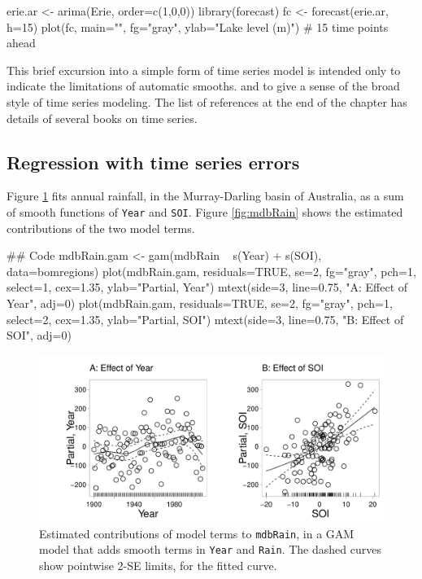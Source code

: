 \documentclass{tufte-book}\usepackage[]{graphicx}\usepackage[]{color}
\newcommand{\txtt}[1]{\texttt{#1}}
\begin{document}
\begin{marginfigure}[-5cm]
\begin{Schunk}
\begin{Sinput}
erie.ar <- arima(Erie,
            order=c(1,0,0))
library(forecast)
fc <- forecast(erie.ar,
               h=15)
plot(fc, main="", fg="gray",
     ylab="Lake level (m)")
  # 15 time points ahead
\end{Sinput}
\end{Schunk}
\end{marginfigure}

This brief excursion into a simple form of time series model is
intended only to indicate the limitations of automatic smooths.  and
to give a sense of the broad style of time series modeling.  The list
of references at the end of the chapter has details of several books
on time series.

\subsection{Regression with time series errors}

Figure \ref{fig:mdbRainSM} fits annual rainfall, in the Murray-Darling basin of
Australia, as a sum of smooth functions of \txtt{Year} and \txtt{SOI}.
Figure \ref{fig:mdbRain} shows the estimated contributions of the two
model terms.
\begin{Schunk}
\begin{Sinput}
## Code
mdbRain.gam <- gam(mdbRain ~ s(Year) + s(SOI),
                   data=bomregions)
plot(mdbRain.gam, residuals=TRUE, se=2, fg="gray",
     pch=1, select=1, cex=1.35, ylab="Partial, Year")
mtext(side=3, line=0.75, "A: Effect of Year", adj=0)
plot(mdbRain.gam, residuals=TRUE, se=2, fg="gray",
     pch=1, select=2, cex=1.35, ylab="Partial, SOI")
mtext(side=3, line=0.75, "B: Effect of SOI", adj=0)
\end{Sinput}
\end{Schunk}
\begin{figure}
\begin{Schunk}


\centerline{\includegraphics[width=\textwidth]{figs/9-mdb-gam-1} }

\end{Schunk}
  \caption{Estimated contributions of model terms to
    \txtt{mdbRain}, in a GAM model that adds smooth terms in
    \txtt{Year} and \txtt{Rain}. The dashed curves show pointwise
    2-SE limits, for the fitted curve.}\label{fig:mdbRainSM}
\end{figure}
\end{document}
